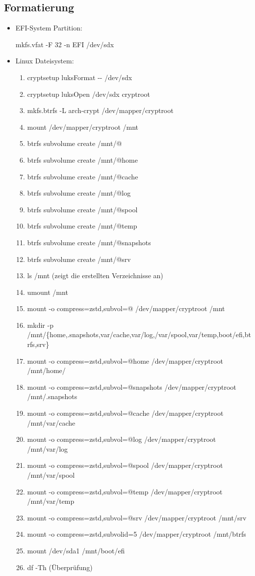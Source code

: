 \documentclass[11pt,a4paper]{article}
\begin{document}
\subsection{Formatierung}
\begin{itemize}
\item EFI-System Partition:

mkfs.vfat -F 32 -n EFI /dev/sdx

\item Linux Dateisystem:
\begin{enumerate}
\item cryptsetup luksFormat -{}-\textcolor{red}{}  /dev/sdx
\item cryptsetup luksOpen /dev/sdx 	cryptroot
\item mkfs.btrfs -L arch-crypt /dev/mapper/cryptroot
\item mount /dev/mapper/cryptroot /mnt
\item btrfs subvolume create /mnt/@
\item btrfs subvolume create /mnt/@home
\item btrfs subvolume create /mnt/@cache
\item btrfs subvolume create /mnt/@log
\item btrfs subvolume create /mnt/@spool
\item btrfs subvolume create /mnt/@temp
\item btrfs subvolume create /mnt/@snapshots
\item btrfs subvolume create /mnt/@srv
\item ls /mnt (zeigt die erstellten Verzeichnisse an)
\item umount /mnt
\item mount -o compress=zstd,subvol=@ /dev/mapper/cryptroot /mnt
\item mkdir -p /mnt/\{home,.snapshots,var/cache,var/log,/var/spool,var/temp,boot/efi,btrfs,srv\}
\item mount -o compress=zstd,subvol=@home /dev/mapper/cryptroot /mnt/home/
\item mount -o compress=zstd,subvol=@snapshots /dev/mapper/cryptroot /mnt/.snapshots
\item mount -o compress=zstd,subvol=@cache /dev/mapper/cryptroot /mnt/var/cache
\item mount -o compress=zstd,subvol=@log /dev/mapper/cryptroot /mnt/var/log
\item mount -o compress=zstd,subvol=@spool /dev/mapper/cryptroot /mnt/var/spool
\item mount -o compress=zstd,subvol=@temp /dev/mapper/cryptroot /mnt/var/temp
\item mount -o compress=zstd,subvol=@srv /dev/mapper/cryptroot /mnt/srv
\item mount -o compress=zstd,subvolid=5 /dev/mapper/cryptroot /mnt/btrfs 
\item mount /dev/sda1 /mnt/boot/efi
\item df -Th (Überprüfung)
\end{enumerate}
\end{itemize}
\end{document}
